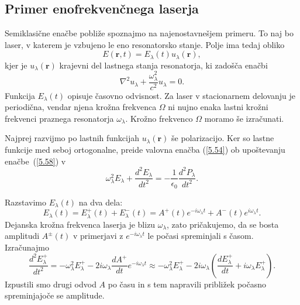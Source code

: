 \subsection*{Primer enofrekvenčnega laserja}
Semiklasične enačbe pobliže spoznajmo na najenostavnešjem primeru. To naj bo laser, 
v katerem je vzbujeno le eno resonatorsko stanje. Polje ima tedaj obliko
\begin{equation}  
\label{5.57}
E(\mathbf{r},t)= E_{\lambda}(t)u_{\lambda}(\mathbf{r}),
\end{equation}
kjer je $u_{\lambda}(\mathbf{r})$ krajevni del lastnega stanja resonatorja, ki
zadošča enačbi 
\begin{equation}  
\label{5.58}
\nabla^2 u_{\lambda}+\frac{\omega_{\lambda}^2}{c^2}u_{\lambda}=0.
\end{equation}
Funkcija $E_{\lambda}(t)$ opisuje časovno odvisnost. Za laser v stacionarnem
delovanju je periodična, vendar njena krožna frekvenca $\Omega$ ni nujno enaka lastni
krožni frekvenci praznega resonatorja $\omega_{\lambda}$. Krožno frekvenco 
$\Omega$ moramo še izračunati.

Najprej razvijmo po lastnih funkcijah $u_{\lambda}(\mathbf{r})$ še polarizacijo. 
Ker so lastne funkcije med seboj ortogonalne, preide valovna enačba (\ref{5.54}) 
ob upoštevanju enačbe~(\ref{5.58}) v 
\begin{equation}  
\label{5.59}
\omega_{\lambda}^2 E_{\lambda}+\frac{d^2 E_\lambda}{dt^2}= - \frac{1}{\epsilon_0}\frac{d^2P_\lambda}{dt^2}.
\end{equation}

Razstavimo $E_{\lambda}(t)$ na dva dela: 
\begin{equation}  \label{5.60}
E_{\lambda}(t)=E_{\lambda}^+(t)+E_{\lambda}^-(t)=A^+(t)e^{-i
\omega_{\lambda}t}+A^-(t)e^{i \omega_{\lambda}t}.
\end{equation}
Dejanska krožna frekvenca laserja je blizu $\omega_{\lambda}$, zato pričakujemo,
da se bosta amplitudi $A^{\pm}(t)$ v primerjavi z $e^{-i \omega_{\lambda}t}$ le
počasi spreminjali s časom. Izračunajmo 
\begin{equation}  
\label{5.61}
\frac{d^2 E_\lambda^+}{dt^2}=-\omega_{\lambda}^2 E_{\lambda}^+ - 2i \omega_{\lambda} 
\frac{dA^+}{dt} e^{-i \omega_{\lambda}t} \approx 
-\omega_{\lambda}^2 E_{\lambda}^+-2i \omega_{\lambda}\left(\frac{dE_{\lambda}^+}{dt}+
i \omega_{\lambda}E_{\lambda}^+\right).
\end{equation}
Izpustili smo drugi odvod $A$ po času in s tem napravili približek počasno spreminjajoče se amplitude.

